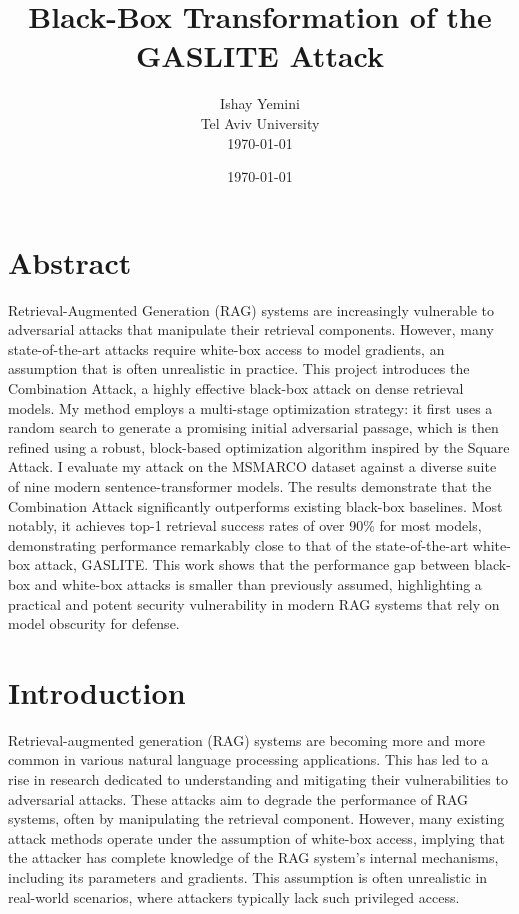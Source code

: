 \documentclass[a4paper, sigconf]{acmart}
\title{Black-Box Transformation of the GASLITE Attack}
\author{Ishay Yemini\\Tel Aviv University\\ \today}
\date{\today}
\begin{document}
\maketitle

\section*{Abstract}

Retrieval-Augmented Generation (RAG) systems are increasingly vulnerable to adversarial attacks that manipulate their retrieval components. However, many state-of-the-art attacks require white-box access to model gradients, an assumption that is often unrealistic in practice. This project introduces the Combination Attack, a highly effective black-box attack on dense retrieval models. My method employs a multi-stage optimization strategy: it first uses a random search to generate a promising initial adversarial passage, which is then refined using a robust, block-based optimization algorithm inspired by the Square Attack. I evaluate my attack on the MSMARCO \cite{bajaj2018} dataset against a diverse suite of nine modern sentence-transformer models. The results demonstrate that the Combination Attack significantly outperforms existing black-box baselines. Most notably, it achieves top-1 retrieval success rates of over 90\% for most models, demonstrating performance remarkably close to that of the state-of-the-art white-box attack, GASLITE. This work shows that the performance gap between black-box and white-box attacks is smaller than previously assumed, highlighting a practical and potent security vulnerability in modern RAG systems that rely on model obscurity for defense.


\section{Introduction}

Retrieval-augmented generation (RAG) systems are becoming more and more common in various natural language processing applications. This has led to a rise in research dedicated to understanding and mitigating their vulnerabilities to adversarial attacks. These attacks aim to degrade the performance of RAG systems, often by manipulating the retrieval component. However, many existing attack methods operate under the assumption of white-box access, implying that the attacker has complete knowledge of the RAG system's internal mechanisms, including its parameters and gradients. This assumption is often unrealistic in real-world scenarios, where attackers typically lack such privileged access. 
\end{document}
